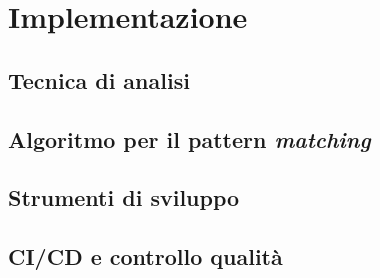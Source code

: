 \chapter{Implementazione}
\label{chapter:implementation}

\section{Tecnica di analisi}

\section{Algoritmo per il pattern \textit{matching}}

\section{Strumenti di sviluppo}

\section{CI/CD e controllo qualità}
